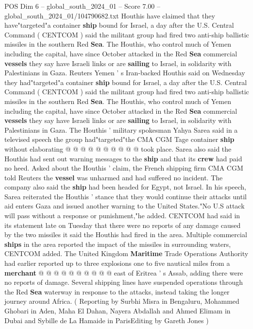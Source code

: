 \begin{textsample}{POS Dim 6 – global\_south\_2024\_01 – Score 7.00 – global\_south\_2024\_01/104790682.txt}  \label{ex:f6_pos_087}
Houthis have claimed that they have"targeted"a container \textbf{ship} bound for Israel, a day after the U.S.
Central Command ( CENTCOM ) said the militant group had fired two anti-ship ballistic missiles in the southern Red \textbf{Sea}.
The Houthis, who control much of Yemen including the capital, have since October attacked in the Red \textbf{Sea} commercial \textbf{vessels} they say have Israeli links or are \textbf{sailing} to Israel, in solidarity with Palestinians in Gaza.
Reuters Yemen ' s Iran-backed Houthis said on Wednesday they had"targeted"a container \textbf{ship} bound for Israel, a day after the U.S.
Central Command ( CENTCOM ) said the militant group had fired two anti-ship ballistic missiles in the southern Red \textbf{Sea}.
The Houthis, who control much of Yemen including the capital, have since October attacked in the Red \textbf{Sea} commercial \textbf{vessels} they say have Israeli links or are \textbf{sailing} to Israel, in solidarity with Palestinians in Gaza.
The Houthis ' military spokesman Yahya Sarea said in a televised speech the group had"targeted"the CMA CGM Tage container \textbf{ship} without elaborating @ @ @ @ @ @ @ @ @ @ took place.
Sarea also said the Houthis had sent out warning messages to the \textbf{ship} and that its \textbf{crew} had paid no heed.
Asked about the Houthis ' claim, the French shipping firm CMA CGM told Reuters the \textbf{vessel} was unharmed and had suffered no incident.
The company also said the \textbf{ship} had been headed for Egypt, not Israel.
In his speech, Sarea reiterated the Houthis ' stance that they would continue their attacks until aid enters Gaza and issued another warning to the United States."No U.S attack will pass without a response or punishment,"he added.
CENTCOM had said in its statement late on Tuesday that there were no reports of any damage caused by the two missiles it said the Houthis had fired in the area.
Multiple commercial \textbf{ships} in the area reported the impact of the missiles in surrounding waters, CENTCOM added.
The United Kingdom \textbf{Maritime} Trade Operations Authority had earlier reported up to three explosions one to five nautical miles from a \textbf{merchant} @ @ @ @ @ @ @ @ @ @ east of Eritrea ' s Assab, adding there were no reports of damage.
Several shipping lines have suspended operations through the Red \textbf{Sea} waterway in response to the attacks, instead taking the longer journey around Africa. ( Reporting by Surbhi Misra in Bengaluru, Mohammed Ghobari in Aden, Maha El Dahan, Nayera Abdallah and Ahmed Elimam in Dubai and Sybille de La Hamaide in ParisEditing by Gareth Jones )

\end{textsample}
